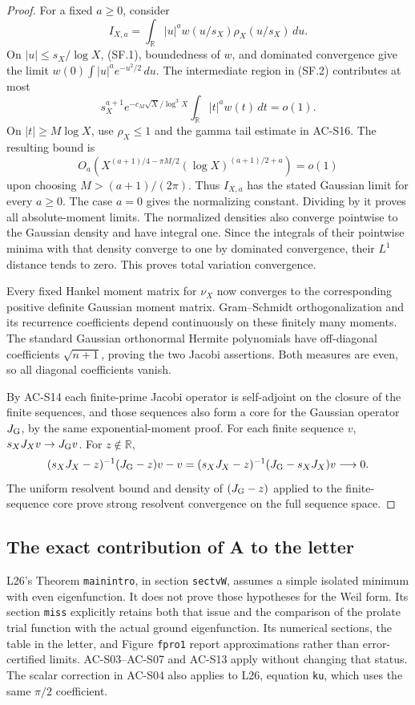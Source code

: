 \begin{proof}
For a fixed \(a\geq0\), consider
\[
 I_{X,a}=\int_{\mathbb R}|u|^a
             w(u/s_X)\rho_X(u/s_X)\,du.
\]
On \(|u|\leq s_X/\log X\), (SF.1), boundedness of \(w\), and
dominated convergence give the limit
\(w(0)\int|u|^ae^{-u^2/2}\,du\).
The intermediate region in (SF.2) contributes at most
\[
 s_X^{a+1}e^{-c_M\sqrt X/\log^3X}
                   \int_{\mathbb R}|t|^aw(t)\,dt=o(1).
\]
On \(|t|\geq M\log X\), use \(\rho_X\leq1\) and the gamma tail
estimate in AC-S16.  The resulting bound is
\[
 O_a\!\left(
 X^{(a+1)/4-\pi M/2}
 (\log X)^{(a+1)/2+a}\right)=o(1)
\]
upon choosing \(M>(a+1)/(2\pi)\).
Thus \(I_{X,a}\) has the stated Gaussian limit for every \(a\geq0\).
The case \(a=0\) gives the normalizing constant.  Dividing by it
proves all absolute-moment limits.  The normalized densities also
converge pointwise to the Gaussian density and have integral one.
Since the integrals of their pointwise minima with that density
converge to one by dominated convergence, their \(L^1\) distance
tends to zero.  This proves total variation convergence.

Every fixed Hankel moment matrix for \(\nu_X\) now converges to
the corresponding positive definite Gaussian moment matrix.
Gram--Schmidt orthogonalization and its recurrence coefficients
depend continuously on these finitely many moments.  The standard
Gaussian orthonormal Hermite polynomials have off-diagonal
coefficients \(\sqrt{n+1}\), proving the two Jacobi assertions.
Both measures are even, so all diagonal coefficients vanish.

By AC-S14 each finite-prime Jacobi operator is self-adjoint on the
closure of the finite sequences, and those sequences also form a
core for the Gaussian operator \(J_{\rm G}\), by the same
exponential-moment proof.  For each finite sequence \(v\),
\(s_XJ_Xv\to J_{\rm G}v\).  For \(z\notin\mathbb R\),
\[
 (s_XJ_X-z)^{-1}(J_{\rm G}-z)v-v
  =(s_XJ_X-z)^{-1}(J_{\rm G}-s_XJ_X)v\longrightarrow0.
\]
The uniform resolvent bound and density of
\((J_{\rm G}-z)\) applied to the finite-sequence core prove strong
resolvent convergence on the full sequence space.
\end{proof}

\subsection{The exact contribution of A to the letter}

L26's Theorem \texttt{mainintro}, in section \texttt{sectvW}, assumes
a simple isolated minimum with even eigenfunction.  It does not prove
those hypotheses for the Weil form.  Its section \texttt{miss}
explicitly retains both that issue and the comparison of the
prolate trial function with the actual ground eigenfunction.  Its
numerical sections, the table in the letter, and Figure
\texttt{fpro1} report approximations rather than error-certified
limits.  AC-S03--AC-S07 and AC-S13 apply without changing that status.
The scalar correction in AC-S04 also applies to L26, equation
\texttt{ku}, which uses the same \(\pi/2\) coefficient.

